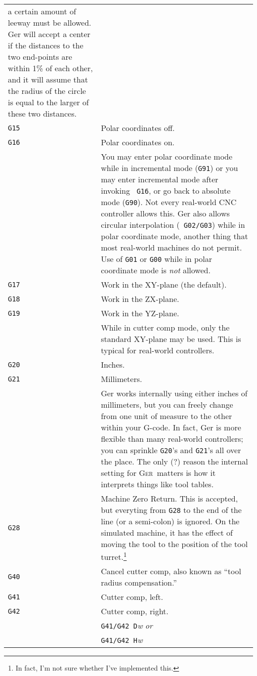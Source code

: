 \documentclass[titlepage,oneside,10pt]{article}
\newcommand{\ger}{\textsc{Ger}}
\begin{document}
\begin{longtable}{lp{10cm}}
a certain amount of leeway must be allowed. Ger will accept a center
if the distances to the two end-points are within 1\% of each other,
and it will assume that the radius of the circle is equal to the
larger of these two distances.\\
{\tt G15}&Polar coordinates off.\\
{\tt G16}&Polar coordinates on. \\
&You may enter polar coordinate mode while in incremental mode
({\tt G91}) or you may enter incremental mode after invoking {\tt
  G16}, or go back to absolute mode ({\tt G90}). Not every real-world CNC
controller allows this. Ger also allows circular interpolation ({\tt
  G02/G03}) while in polar coordinate mode, another thing that most
real-world machines do not permit. Use of {\tt G01} or {\tt G00} while
in polar coordinate mode is \emph{not} allowed.\\ 
{\tt G17}& Work in the XY-plane (the default).\\
{\tt G18}& Work in the ZX-plane.\\
{\tt G19}& Work in the YZ-plane.\\
& While in cutter comp mode, only the standard XY-plane may be
used. This is typical for real-world controllers.\\
{\tt G20}&Inches.\\
{\tt G21}&Millimeters.\\
& Ger works internally using either inches of millimeters, but you can
freely change from one unit of measure to the other within your
G-code. In fact, Ger is more flexible than many real-world
controllers; you can sprinkle {\tt G20}'s and {\tt G21}'s all over the
place. The only (?) reason the internal setting for \ger\ matters is
how it interprets things like tool tables. \\  
{\tt G28}&Machine Zero Return. This is accepted, but everyting from
{\tt G28} to the end of the line (or a semi-colon) is ignored. On the
simulated machine, it has the effect of moving the tool to the
position of the tool turret.\footnote{In fact, I'm not sure whether
  I've implemented this.}\\
{\tt G40}&Cancel cutter comp, also known as ``tool radius compensation.''\\
{\tt G41}&Cutter comp, left.\\
{\tt G42}&Cutter comp, right. \\
&{\tt G41/G42 D}\emph{w} \emph{or}\\
&{\tt G41/G42 H}\emph{w} \\

\end{longtable}
\end{document}
